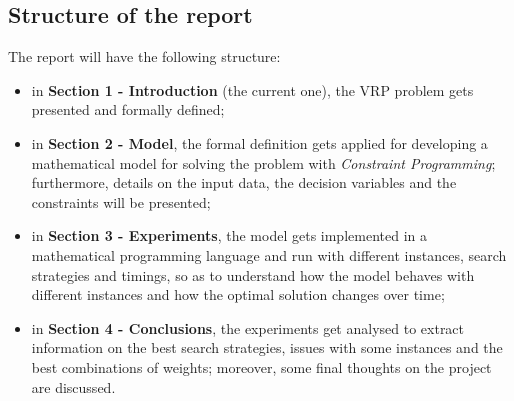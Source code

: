 \documentclass[../main.tex]{subfiles}
\begin{document}
\subsection{Structure of the report}
The report will have the following structure:
\begin{itemize}
    \item in \textbf{Section 1 - Introduction} (the current one), the VRP problem gets presented and formally defined;
    \item in \textbf{Section 2 - Model}, the formal definition gets applied for developing a mathematical model for solving the problem with \textit{Constraint Programming}; furthermore, details on the input data, the decision variables and the constraints will be presented;
    \item in \textbf{Section 3 - Experiments}, the model gets implemented in a mathematical programming language and run with different instances, search strategies and timings, so as to understand how the model behaves with different instances and how the optimal solution changes over time;
    \item in \textbf{Section 4 - Conclusions}, the experiments get analysed to extract information on the best search strategies, issues with some instances and the best combinations of weights; moreover, some final thoughts on the project are discussed.
\end{itemize}
\end{document}

